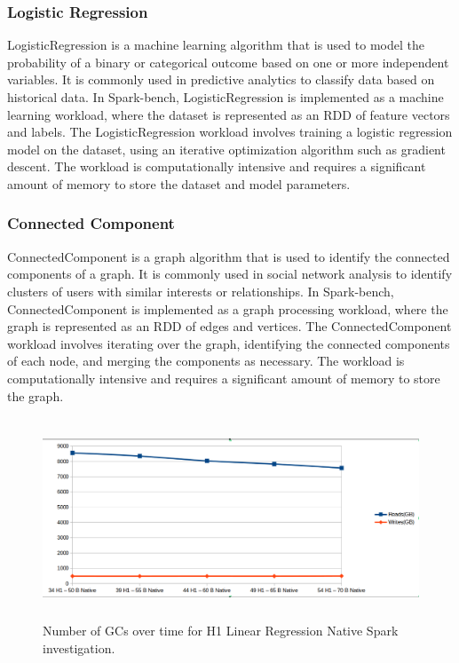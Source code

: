 \subsubsection{Logistic Regression}
LogisticRegression is a machine learning algorithm that is used to
model the probability of a binary or categorical outcome based on one
or more independent variables. It is commonly used in predictive
analytics to classify data based on historical data. In Spark-bench,
LogisticRegression is implemented as a machine learning workload,
where the dataset is represented as an RDD of feature vectors and
labels. The LogisticRegression workload involves training a logistic
regression model on the dataset, using an iterative optimization
algorithm such as gradient descent. The workload is computationally
intensive and requires a significant amount of memory to store the
dataset and model parameters.

\subsubsection{Connected Component}
ConnectedComponent is a graph algorithm that is used to identify the
connected components of a graph. It is commonly used in social network
analysis to identify clusters of users with similar interests or
relationships. In Spark-bench, ConnectedComponent is implemented as a
graph processing workload, where the graph is represented as an RDD of
edges and vertices. The ConnectedComponent workload involves iterating
over the graph, identifying the connected components of each node, and
merging the components as necessary. The workload is computationally
intensive and requires a significant amount of memory to store the
graph.


\begin{figure}[ht]
    \includegraphics[width=12cm,height=6cm]{./fig/gcs_linr_h1_native.png}
    \caption{Number of GCs over time for H1 Linear Regression Native
    Spark investigation.}
    \label{fig:gcs_linr_h1_native}
\end{figure}

